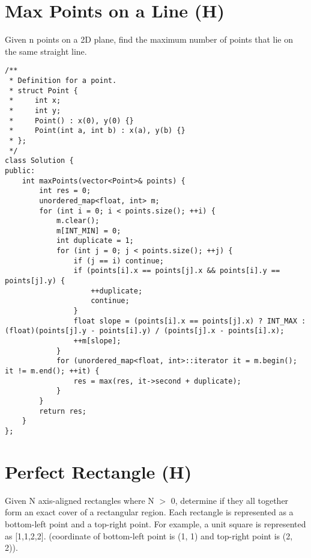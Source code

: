 \section{Max Points on a Line (H)}
Given n points on a 2D plane, find the maximum number of points that lie on the same straight line.\\

\begin{lstlisting}
/**
 * Definition for a point.
 * struct Point {
 *     int x;
 *     int y;
 *     Point() : x(0), y(0) {}
 *     Point(int a, int b) : x(a), y(b) {}
 * };
 */
class Solution {
public:
    int maxPoints(vector<Point>& points) {
        int res = 0;
        unordered_map<float, int> m;
        for (int i = 0; i < points.size(); ++i) {
            m.clear();
            m[INT_MIN] = 0;
            int duplicate = 1;
            for (int j = 0; j < points.size(); ++j) {
                if (j == i) continue;
                if (points[i].x == points[j].x && points[i].y == points[j].y) {
                    ++duplicate;
                    continue;
                }
                float slope = (points[i].x == points[j].x) ? INT_MAX : (float)(points[j].y - points[i].y) / (points[j].x - points[i].x);
                ++m[slope];
            }
            for (unordered_map<float, int>::iterator it = m.begin(); it != m.end(); ++it) {
                res = max(res, it->second + duplicate);
            }
        }
        return res;
    }
};
\end{lstlisting}


\section{Perfect Rectangle (H)}
Given N axis-aligned rectangles where N $>$ 0, determine if they all together form an exact cover of a rectangular region. Each rectangle is represented as a bottom-left point and a top-right point. For example, a unit square is represented as [1,1,2,2]. (coordinate of bottom-left point is (1, 1) and top-right point is (2, 2)). \\

